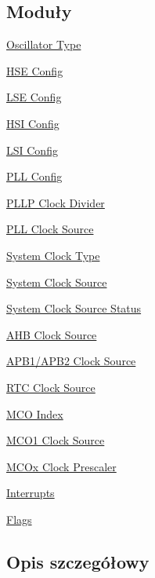 \subsection*{Moduły}
\begin{DoxyCompactItemize}
\item 
\hyperlink{group___r_c_c___oscillator___type}{Oscillator Type}
\item 
\hyperlink{group___r_c_c___h_s_e___config}{H\+S\+E Config}
\item 
\hyperlink{group___r_c_c___l_s_e___config}{L\+S\+E Config}
\item 
\hyperlink{group___r_c_c___h_s_i___config}{H\+S\+I Config}
\item 
\hyperlink{group___r_c_c___l_s_i___config}{L\+S\+I Config}
\item 
\hyperlink{group___r_c_c___p_l_l___config}{P\+L\+L Config}
\item 
\hyperlink{group___r_c_c___p_l_l_p___clock___divider}{P\+L\+L\+P Clock Divider}
\item 
\hyperlink{group___r_c_c___p_l_l___clock___source}{P\+L\+L Clock Source}
\item 
\hyperlink{group___r_c_c___system___clock___type}{System Clock Type}
\item 
\hyperlink{group___r_c_c___system___clock___source}{System Clock Source}
\item 
\hyperlink{group___r_c_c___system___clock___source___status}{System Clock Source Status}
\item 
\hyperlink{group___r_c_c___a_h_b___clock___source}{A\+H\+B Clock Source}
\item 
\hyperlink{group___r_c_c___a_p_b1___a_p_b2___clock___source}{A\+P\+B1/\+A\+P\+B2 Clock Source}
\item 
\hyperlink{group___r_c_c___r_t_c___clock___source}{R\+T\+C Clock Source}
\item 
\hyperlink{group___r_c_c___m_c_o___index}{M\+C\+O Index}
\item 
\hyperlink{group___r_c_c___m_c_o1___clock___source}{M\+C\+O1 Clock Source}
\item 
\hyperlink{group___r_c_c___m_c_ox___clock___prescaler}{M\+C\+Ox Clock Prescaler}
\item 
\hyperlink{group___r_c_c___interrupt}{Interrupts}
\item 
\hyperlink{group___r_c_c___flag}{Flags}
\end{DoxyCompactItemize}


\subsection{Opis szczegółowy}
